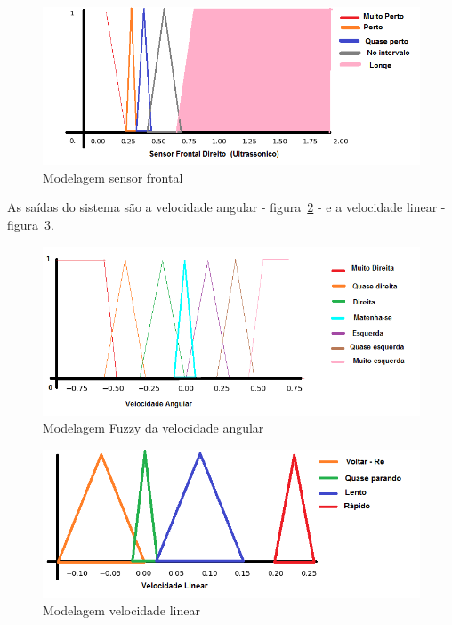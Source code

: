 \documentclass[twoside,conference,a4paper]{IEEEtran}
\begin{document}
\begin{figure}[ht]
\centering
\includegraphics[width=1\hsize]{images/sensor-wall-follow-model.png}
\caption{Modelagem sensor frontal}
\label{fig:fig5}
\end{figure}

As saídas do sistema são a velocidade angular - figura~\ref{fig:fig6} - e a velocidade linear - figura~\ref{fig:fig7}. 

\begin{figure}[ht]
\centering
\includegraphics[width=1\hsize]{images/velocidade-angular-saida.png}
\caption{Modelagem Fuzzy da velocidade angular}
\label{fig:fig6}
\end{figure}

\begin{figure}[ht]
\centering
\includegraphics[width=1\hsize]{images/velocidade-linear-saida.png}
\caption{Modelagem velocidade linear}
\label{fig:fig7}
\end{figure}
\end{document}

